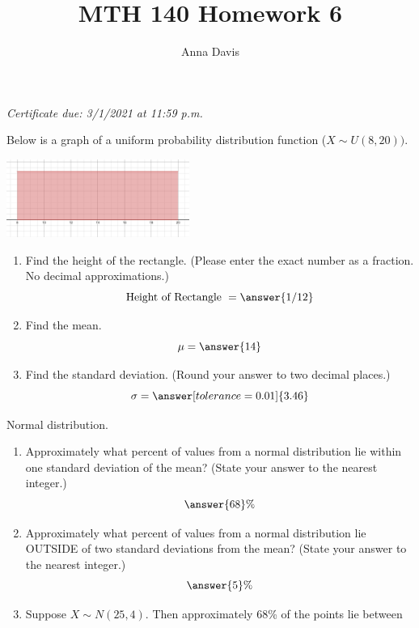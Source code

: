 \documentclass{ximera}
\author{Anna Davis} \title{MTH 140 Homework 6}
\begin{document}
\begin{abstract}

\end{abstract}
\maketitle
 \textit{Certificate due: 3/1/2021 at 11:59 p.m.}
 \begin{problem}\label{prob:140hom4prob6}
Below is a graph of a uniform probability distribution function ($X\sim U(8,20))$.  
\begin{image}
   
\includegraphics[height=1in]{140H4pic3.jpg}~
 
\end{image}
\begin{enumerate}
    \item Find the height of the rectangle. (Please enter the exact number as a fraction.  No decimal approximations.)
    $$\mbox{Height of Rectangle }=\answer{1/12}$$
    \item Find the mean.
    $$\mu=\answer{14}$$
    \item Find the standard deviation. (Round your answer to two decimal places.)
    $$\sigma=\answer[tolerance=0.01]{3.46}$$
\end{enumerate}

\end{problem}
 
 
 
 
 
\begin{problem}\label{prob:140hom5prob1}
Normal distribution.
\begin{enumerate} 
\item
Approximately what percent of values from a normal distribution lie within one standard deviation of the mean? (State your answer to the nearest integer.)
$$\answer{68}\%$$
\item Approximately what percent of values from a normal distribution lie OUTSIDE of two standard deviations from the mean?  (State your answer to the nearest integer.)
$$\answer{5}\%$$
\item Suppose $X\sim N(25, 4)$.  Then approximately 68\% of the points lie between 

\end{enumerate}

\end{problem}
\end{document}
